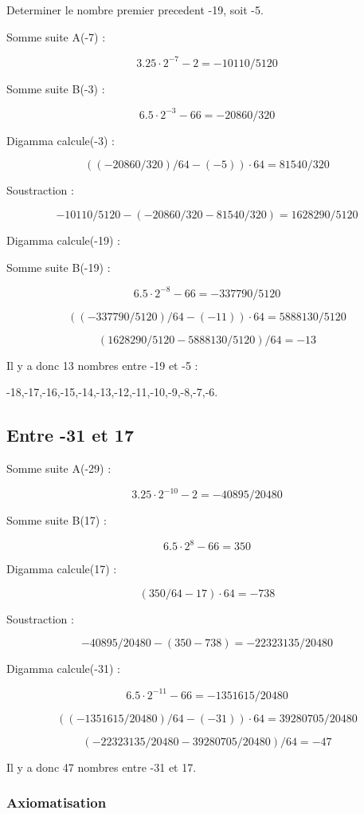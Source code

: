 \documentclass[a4paper,11pt]{article}
\begin{document}
Determiner le nombre premier precedent -19, soit -5.

Somme suite A(-7) :

\[
3.25 \cdot 2^{-7} - 2 = -10110/5120
\]

Somme suite B(-3) :

\[
6.5 \cdot 2^{-3} - 66 = -20860/320
\]

Digamma calcule(-3) :

\[
((-20860/320)/64 - (-5)) \cdot 64 = 81540/320
\]

Soustraction :

\[
-10110/5120 - (-20860/320 - 81540/320) = 1628290/5120
\]

Digamma calcule(-19) :

Somme suite B(-19) :

\[
6.5 \cdot 2^{-8} - 66 = -337790/5120
\]

\[
((-337790/5120)/64 - (-11)) \cdot 64 = 5888130/5120
\]

\[
(1628290/5120 - 5888130/5120)/64 = -13
\]

Il y a donc 13 nombres entre -19 et -5 :

-18,-17,-16,-15,-14,-13,-12,-11,-10,-9,-8,-7,-6.

\subsection*{Entre -31 et 17}

Somme suite A(-29) :

\[
3.25 \cdot 2^{-10} - 2 = -40895/20480
\]

Somme suite B(17) :

\[
6.5 \cdot 2^{8} - 66 = 350
\]

Digamma calcule(17) :

\[
(350/64 - 17) \cdot 64 = -738
\]

Soustraction :

\[
-40895/20480 - (350 - 738) = -22323135/20480
\]

Digamma calcule(-31) :

\[
6.5 \cdot 2^{-11} - 66 = -1351615/20480
\]

\[
((-1351615/20480)/64 - (-31)) \cdot 64 = 39280705/20480
\]

\[
(-22323135/20480 - 39280705/20480)/64 = -47
\]

Il y a donc 47 nombres entre -31 et 17.


\subsubsection{Axiomatisation}
\end{document}
